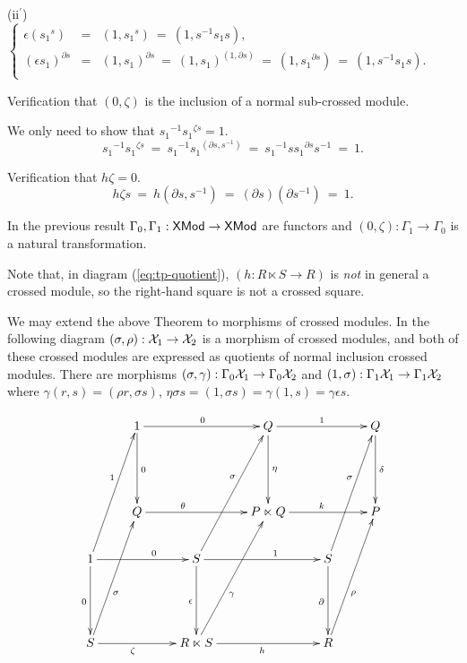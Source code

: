 \begin{pf}
\bigskip
(ii$^{\prime}$)~ 
$\left\{ 
\begin{array}{rcl}
\epsilon({s_1}^s) & = & 
(1,{s_1}^s) ~=~ (1,s^{-1}s_1s), \\
(\epsilon s_1)^{\partial s} & = &
(1,s_1)^{\partial s} ~=~ 
(1,s_1)^{(1, \partial s)} ~=~ (1,{s_1}^{\partial s})~=~
(1, s^{-1}s_1s). \\
\end{array}\right.$

\bigskip\noindent
Verification that $(0,\zeta)$ is the inclusion of a normal sub-crossed module.

\bigskip\noindent
We only need to show that ${s_1}^{-1} {s_1}^{\zeta s} = 1$.
$$
{s_1}^{-1} {s_1}^{\zeta s} ~=~
{s_1}^{-1} {s_1}^{(\partial s, s^{-1})} ~=~
{s_1}^{-1} s {s_1}^{\partial s} s^{-1} ~=~ 1.
$$

\bigskip\noindent
Verification that $h\zeta = 0$.
$$
h \zeta s ~=~ h(\partial s, s^{-1}) ~=~ (\partial s)(\partial s^{-1}) ~=~ 1.
$$
\end{pf}

\begin{cor}
In the previous result $\Gamma_0, \Gamma_1 : {\sf XMod} \to {\sf XMod}$ are functors
and $(0,\zeta) : \Gamma_1 \to \Gamma_0$ is a natural transformation.
\end{cor}

Note that, in diagram (\ref{eq:tp-quotient}),  
$(h : R \ltimes S \to R)$ is \emph{not} in general a crossed module,
so the right-hand square is not a crossed square.

\newpage
We may extend the above Theorem to morphisms of crossed modules. 
In the following diagram $(\sigma,\rho) : \mathcal{X}_1 \to \mathcal{X}_2$ 
is a morphism of crossed modules, 
and both of these crossed modules are expressed as quotients of 
normal inclusion crossed modules. 
There are morphisms $(\sigma,\gamma) : \Gamma_0\mathcal{X}_1 \to \Gamma_0\mathcal{X}_2$ 
and $(1,\sigma) : \Gamma_1\mathcal{X}_1 \to \Gamma_1\mathcal{X}_2$ 
where $\gamma(r,s) = (\rho r, \sigma s)$, 
$\eta\sigma s = (1,\sigma s) = \gamma(1,s) = \gamma\epsilon s$. 

\begin{equation} \label{eq:tp-quotient-morphism}
\vcenter{\xy
\xymatrix{
     & 1 \ar[dd]^{0} \ar[rr]^0
         &   & Q \ar[rr]^{1} \ar[dd]^{\eta} 
                 &   & Q \ar[dd]^{\delta}  \\
     &   &   &   &   & \\ 
     & Q \ar[rr]^(0.35){\theta} 
         &   & P \ltimes Q \ar[rr]^{k} 
                 &   & P  \\ 
  1 \ar[dd]_{0} \ar[rr]^(0.6){0} \ar[ruuu]^(0.6){1} 
     &   & S \ar[rr]^(0.6){1} \ar[dd]_{\epsilon} \ar[ruuu]^(0.6){\sigma}  
             &   & S \ar[dd]_{\partial} \ar[ruuu]^(0.6){\sigma} 
                     & \\
     &   &   &   &   & \\
  S \ar[rr]_(0.4){\zeta} \ar[ruuu]_(0.4){\sigma} 
     &   & R \ltimes S \ar[rr]_{h} \ar[ruuu]_(0.4){\gamma} 
             &   & R \ar[ruuu]_(0.4){\rho} 
                     & \\
}
\endxy} 
\end{equation}


